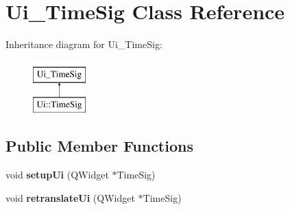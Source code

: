 \hypertarget{class_ui___time_sig}{}\section{Ui\+\_\+\+Time\+Sig Class Reference}
\label{class_ui___time_sig}
Inheritance diagram for Ui\+\_\+\+Time\+Sig\+:\begin{figure}[H]
\begin{center}
\leavevmode
\includegraphics[height=2.000000cm]{class_ui___time_sig}
\end{center}
\end{figure}
\subsection*{Public Member Functions}
\begin{DoxyCompactItemize}
\item 
\mbox{\label{class_ui___time_sig_a1f5dc98cfddfbff246648379d8ebf2ea}} 
void {\bfseries setup\+Ui} (Q\+Widget $\ast$Time\+Sig)
\item 
\mbox{\label{class_ui___time_sig_a7823d0175e7175ba0b72ffba733f9e6c}} 
void {\bfseries retranslate\+Ui} (Q\+Widget $\ast$Time\+Sig)
\end{DoxyCompactItemize}
